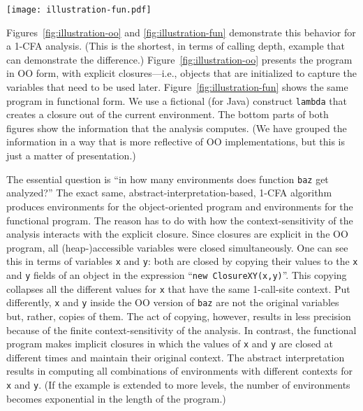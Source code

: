 \begin{figure*}[tbp]
\begin{center}
\texttt{[image: illustration-fun.pdf]}

\caption{The same program in functional form (implicit
closures). \emph{The lambda expressions are drawn outside their
lexical environment to illustrate the analogy with the OO code.}  The
number of environments out of the abstract interpretation is now
 because variables \texttt{x} and \texttt{y} in the rightmost
lambda were not closed together and have different contexts.}
\label{fig:illustration-fun}
\end{center}
\end{figure*}


Figures~\ref{fig:illustration-oo} and \ref{fig:illustration-fun}
demonstrate this behavior for a 1-CFA analysis. (This is the shortest,
in terms of calling depth, example that can demonstrate the
difference.) Figure~\ref{fig:illustration-oo} presents the program in
OO form, with explicit closures---i.e., objects that are initialized
to capture the variables that need to be used
later. Figure~\ref{fig:illustration-fun} shows the same program in
functional form. We use a fictional (for Java) construct
\texttt{lambda} that creates a closure out of the current environment.
The bottom parts of both figures show the information that the
analysis computes. (We have grouped the information in a way that is
more reflective of OO \kCFA{} implementations, but this is just a
matter of presentation.)

The essential question is ``in how many environments does function
\texttt{baz} get analyzed?'' The exact same,
abstract-interpretation-based, 1-CFA{} algorithm produces 
environments for the object-oriented program and  environments
for the functional program. The reason has to do with how the
context-sensitivity of the analysis interacts with the explicit
closure. Since closures are explicit in the OO program, all
(heap-)accessible variables were closed simultaneously. One can see
this in terms of variables \texttt{x} and \texttt{y}: both are closed
by copying their values to the \texttt{x} and \texttt{y} fields of an
object in the expression ``\texttt{new ClosureXY(x,y)}''.  This
copying collapses all the different values for \texttt{x} that have
the same 1-call-site context. Put differently, \texttt{x} and
\texttt{y} inside the OO version of \texttt{baz} are not the original
variables but, rather, copies of them. The act of copying, however,
results in less precision because of the finite context-sensitivity of
the analysis. In contrast, the functional program makes implicit
closures in which the values of \texttt{x} and \texttt{y} are closed at
different times and maintain their original context. The abstract
interpretation results in computing all  combinations of
environments with different contexts for \texttt{x} and
\texttt{y}. (If the example is extended to more levels, the number
of environments becomes exponential in the length of the program.)

